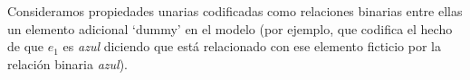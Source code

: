 Consideramos propiedades unarias codificadas como relaciones binarias entre ellas un
elemento adicional `dummy' en el modelo (por ejemplo, que codifica el hecho de que
$e_1$ es \emph{azul} diciendo que est\'a relacionado con ese elemento ficticio por
la relaci\'on binaria \emph{azul}).




